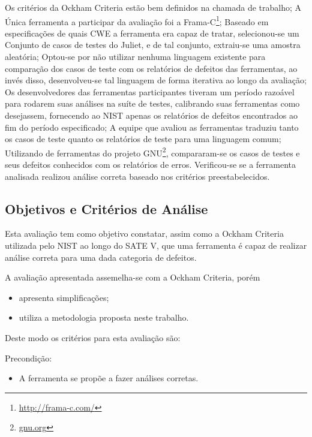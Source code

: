 Os critérios da Ockham Criteria estão bem definidos na chamada de trabalho;
A Única ferramenta a participar da avaliação foi a Frama-C\footnote{\url{http://frama-c.com/}};
Baseado em especificações de quais CWE a ferramenta era capaz de tratar, selecionou-se um Conjunto de casos de testes do Juliet, e de tal conjunto, extraiu-se uma amostra aleatória;
Optou-se por não utilizar nenhuma linguagem existente para comparação dos casos de teste com os relatórios de defeitos das ferramentas, ao invés disso, desenvolveu-se tal linguagem de forma iterativa ao longo da avaliação;
Os desenvolvedores das ferramentas participantes tiveram um período razoável para rodarem suas análises na suíte de testes, calibrando suas ferramentas como desejassem, fornecendo ao NIST apenas os relatórios de defeitos encontrados ao fim do período especificado;
A equipe que avaliou as ferramentas traduziu tanto os casos de teste quanto os relatórios de teste para uma linguagem comum;
Utilizando de ferramentas do projeto GNU\footnote{\url{gnu.org}}, compararam-se os casos de testes e seus defeitos conhecidos com os relatórios de erros.
Verificou-se se a ferramenta analisada realizou análise correta baseado nos critérios preestabelecidos.

\subsection{Objetivos e Critérios de Análise}

Esta avaliação tem como objetivo constatar, assim como a Ockham Criteria utilizada pelo NIST ao longo do SATE V, que uma ferramenta é capaz de realizar análise correta para uma dada categoria de defeitos.

A avaliação apresentada assemelha-se com a Ockham Criteria, porém
\begin{itemize}
  \item apresenta simplificações;
  \item utiliza a metodologia proposta neste trabalho.
\end{itemize}
Deste modo os critérios para esta avaliação são:

Precondição:
\begin{itemize}
  \item A ferramenta se propõe a fazer análises corretas.
\end{itemize}

